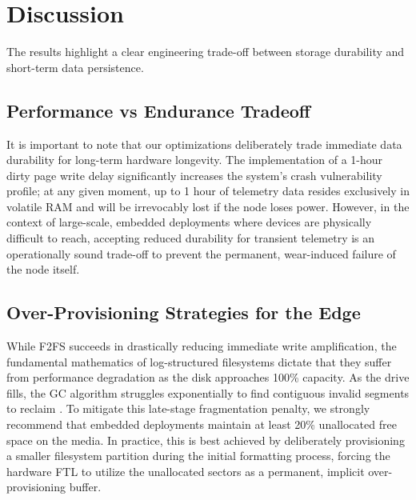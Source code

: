 \documentclass[conference]{IEEEtran}
\begin{document}
\section{Discussion}

The results highlight a clear engineering trade-off between storage durability and short-term data persistence.

\subsection{Performance vs Endurance Tradeoff}
It is important to note that our optimizations deliberately trade immediate data durability for long-term hardware longevity. The implementation of a 1-hour dirty page write delay significantly increases the system's crash vulnerability profile; at any given moment, up to 1 hour of telemetry data resides exclusively in volatile RAM and will be irrevocably lost if the node loses power. However, in the context of large-scale, embedded deployments where devices are physically difficult to reach, accepting reduced durability for transient telemetry is an operationally sound trade-off to prevent the permanent, wear-induced failure of the node itself.

\subsection{Over-Provisioning Strategies for the Edge}
While F2FS succeeds in drastically reducing immediate write amplification, the fundamental mathematics of log-structured filesystems dictate that they suffer from performance degradation as the disk approaches 100\% capacity. As the drive fills, the GC algorithm struggles exponentially to find contiguous invalid segments to reclaim \cite{b25}. To mitigate this late-stage fragmentation penalty, we strongly recommend that embedded deployments maintain at least 20\% unallocated free space on the media. In practice, this is best achieved by deliberately provisioning a smaller filesystem partition during the initial formatting process, forcing the hardware FTL to utilize the unallocated sectors as a permanent, implicit over-provisioning buffer.
\end{document}
